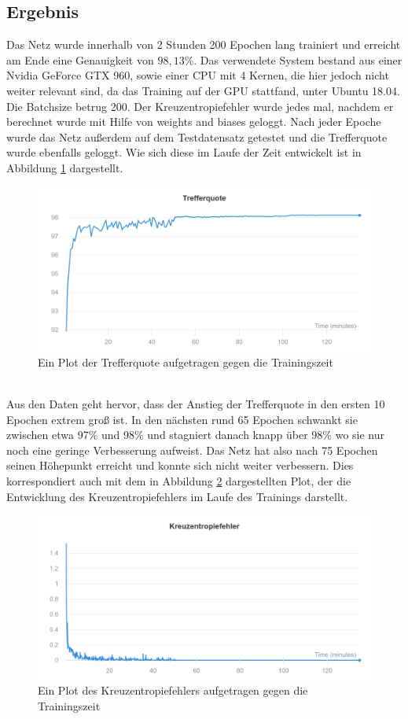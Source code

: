 \documentclass[11pt]{article}
\begin{document}
\subsection{Ergebnis}
Das Netz wurde innerhalb von 2 Stunden 200 Epochen lang trainiert und erreicht am Ende eine Genauigkeit von $98,13\%$. Das verwendete System bestand aus einer Nvidia GeForce GTX 960, sowie einer CPU mit 4 Kernen, die hier jedoch nicht weiter relevant sind, da das Training auf der GPU stattfand, unter Ubuntu 18.04. Die Batchsize betrug 200. Der Kreuzentropiefehler wurde jedes mal, nachdem er berechnet wurde mit Hilfe von weights and biases geloggt. Nach jeder Epoche wurde das Netz außerdem auf dem Testdatensatz getestet und die Trefferquote wurde ebenfalls geloggt. Wie sich diese im Laufe der Zeit entwickelt ist in Abbildung \ref{accuracy} dargestellt.
\begin{figure}[h]
	\includegraphics[width=\linewidth]{../graphics/Wandb_accuracy.png}
	\caption{Ein Plot der Trefferquote aufgetragen gegen die Trainingszeit}
	\label{accuracy}
\end{figure}
\\
Aus den Daten geht hervor, dass der Anstieg der Trefferquote in den ersten 10 Epochen extrem groß ist. In den nächsten rund 65 Epochen schwankt sie zwischen etwa 97\% und 98\% und stagniert danach knapp über 98\% wo sie nur noch eine geringe Verbesserung aufweist. Das Netz hat also nach 75 Epochen seinen Höhepunkt erreicht und konnte sich nicht weiter verbessern. Dies korrespondiert auch mit dem in Abbildung \ref{loss} dargestellten Plot, der die Entwicklung des Kreuzentropiefehlers im Laufe des Trainings darstellt.
\begin{figure}[h]
	\includegraphics[width=\linewidth]{../graphics/Wandb_loss.png}
	\caption{Ein Plot des Kreuzentropiefehlers aufgetragen gegen die Trainingszeit}
	\label{loss}
\end{figure}
\end{document}
